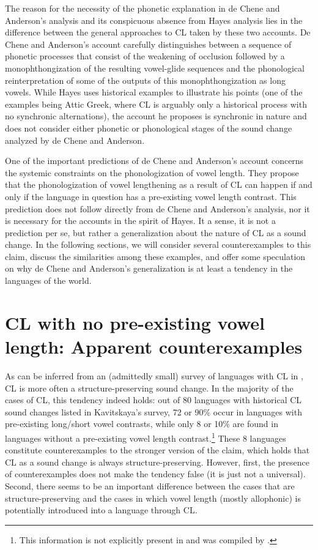\documentclass[output=paper,
modfonts
]{LSP/langsci}
\begin{document}
The reason for the necessity of the phonetic explanation in de Chene and
Anderson's analysis and its conspicuous absence from Hayes analysis lies
in the difference between the general approaches to CL taken by these
two accounts. De Chene and Anderson's account carefully distinguishes
between a sequence of phonetic processes that consist of the weakening
of occlusion followed by a monophthongization of the resulting
vowel-glide sequences and the phonological reinterpretation of some of
the outputs of this monophthongization as long vowels. While Hayes uses
historical examples to illustrate his points (one of the examples being
Attic Greek, where CL is arguably only a historical process with no
synchronic alternations), the account he proposes is synchronic in
nature and does not consider either phonetic or phonological stages of
the sound change analyzed by de Chene and Anderson.

One of the important predictions of de Chene and Anderson's account
concerns the systemic constraints on the phonologization of vowel
length. They propose that the phonologization of vowel lengthening as a
result of CL can happen if and only if the language in question has
a pre-existing vowel length contrast. This prediction does not follow
directly from de Chene and Anderson's analysis, nor it is necessary for
the accounts in the spirit of Hayes. It a sense, it is not a prediction
per se, but rather a generalization about the nature of CL as a sound
change. In the following sections, we will consider several
counterexamples to this claim, discuss the similarities among these
examples, and offer some speculation on why de Chene and Anderson's
generalization is at least a tendency in the languages of the world.

\section{CL with no pre-existing vowel length: Apparent counterexamples}

As can be inferred from an (admittedly small) survey of languages with
CL in \citet{kavitskaya2002}, CL is more often a structure-preserving sound
change. In the majority of the cases of CL, this tendency indeed holds:
out of 80 languages with historical CL sound changes listed in
Kavitskaya's \citeyearpar{kavitskaya2002} survey, 72 or 90\% occur in languages with
pre-existing long/short vowel contrasts, while only 8 or 10\% are found
in languages without a pre-existing vowel length contrast.\footnote{This
  information is not explicitly present in \citet{kavitskaya2002} and was
  compiled by \citet{blevins2009k}.} These 8 languages constitute
counterexamples to the stronger version of the claim, which holds that
CL as a sound change is always structure-preserving. However, first, the
presence of counterexamples does not make the tendency false (it is just
not a universal). Second, there seems to be an important difference
between the cases that are structure-preserving and the cases in which
vowel length (mostly allophonic) is potentially introduced into a
language through CL.
\end{document}
